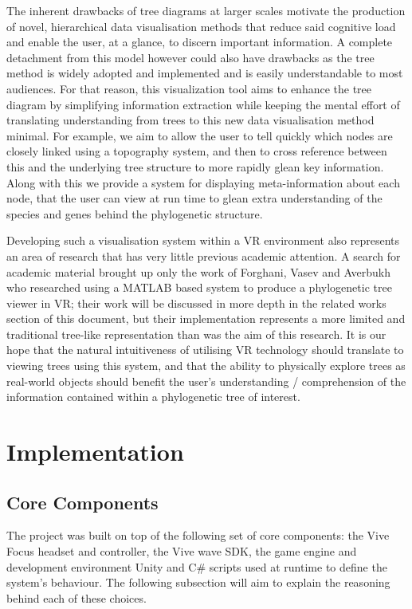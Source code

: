\documentclass[10pt,letterpaper]{article}
\begin{document}
The inherent drawbacks of tree diagrams at larger scales motivate the production of novel, hierarchical data visualisation methods that reduce said cognitive load and enable the user, at a glance, to discern important information. A complete detachment from this model however could also have drawbacks as the tree method is widely adopted and implemented and is easily understandable to most audiences. For that reason, this visualization tool aims to enhance the tree diagram by simplifying information extraction while keeping the mental effort of translating understanding from trees to this new data visualisation method minimal. For example, we aim to allow the user to tell quickly which nodes are closely linked using a topography system, and then to cross reference between this and the underlying tree structure to more rapidly glean key information. Along with this we provide a system for displaying meta-information about each node, that the user can view at run time to glean extra understanding of the species and genes behind the phylogenetic structure. 

Developing such a visualisation system within a VR environment also represents an area of research that has very little previous academic attention. A search for academic material brought up only the work of Forghani, Vasev and Averbukh \cite{bib4} who researched using a MATLAB based system to produce a phylogenetic tree viewer in VR; their work will be discussed in more depth in the related works section of this document, but their implementation represents a more limited and traditional tree-like representation than was the aim of this research. It is our hope that the natural intuitiveness of utilising VR technology should translate to viewing trees using this system, and that the ability to physically explore trees as real-world objects should benefit the user’s understanding / comprehension of the information contained within a phylogenetic tree of interest.

\section*{Implementation}
\subsection*{Core Components}
The project was built on top of the following set of core components: the Vive Focus headset and controller, the Vive wave SDK, the game engine and development environment Unity and C\# scripts used at runtime to define the system’s behaviour. The following subsection will aim to explain the reasoning behind each of these choices.
\end{document}
